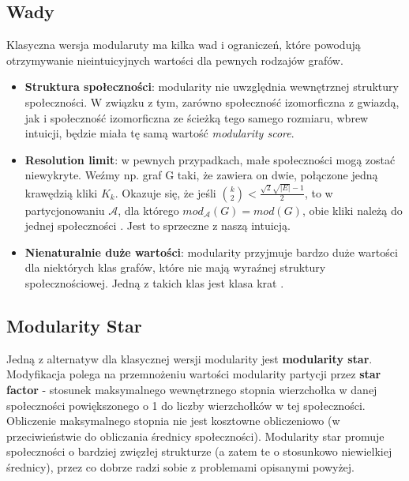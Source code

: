 \documentclass[letterpaper,12pt]{article}
\begin{document}
\subsection{Wady}
  Klasyczna wersja modularuty ma kilka wad i ograniczeń, które powodują otrzymywanie nieintuicyjnych wartości dla pewnych rodzajów grafów.
  \begin{itemize}
    \item \textbf{Struktura społeczności}: modularity nie uwzględnia wewnętrznej struktury społeczności. W związku z tym, zarówno społeczność izomorficzna z gwiazdą, jak i społeczność izomorficzna ze ścieżką tego samego rozmiaru, wbrew intuicji, będzie miała tę samą wartość \textit{modularity score}.
    \item \textbf{Resolution limit}: w pewnych przypadkach, małe społeczności mogą zostać niewykryte. Weźmy np. graf G taki, że zawiera on dwie, połączone jedną krawędzią kliki \(K_k\). Okazuje się, że jeśli \({k\choose2} < \frac{\sqrt{2}\sqrt{|E|}-1}{2}\), to w partycjonowaniu \(\mathcal{A}\), dla którego \(mod_{\mathcal{A}}(G)=mod(G)\), obie kliki należą do jednej społeczności \cite[p.8]{K24}. Jest to sprzeczne z naszą intuicją.
    \item \textbf{Nienaturalnie duże wartości}: modularity przyjmuje bardzo duże wartości dla niektórych klas grafów, które nie mają wyraźnej struktury społecznościowej. Jedną z takich klas jest klasa krat \cite[p.10]{K24}.
  \end{itemize}

\subsection{Modularity Star}
  Jedną z alternatyw dla klasycznej wersji modularity jest \textbf{modularity star}. Modyfikacja polega na przemnożeniu wartości modularity partycji przez \textbf{star factor} - stosunek maksymalnego wewnętrznego stopnia wierzchołka w danej społeczności powiększonego o 1 do liczby wierzchołków w tej społeczności. Obliczenie maksymalnego stopnia nie jest kosztowne obliczeniowo (w przeciwieństwie do obliczania średnicy społeczności). Modularity star promuje społeczności o bardziej zwięzłej strukturze (a zatem te o stosunkowo niewielkiej średnicy), przez co dobrze radzi sobie z problemami opisanymi powyżej.\\
\end{document}

